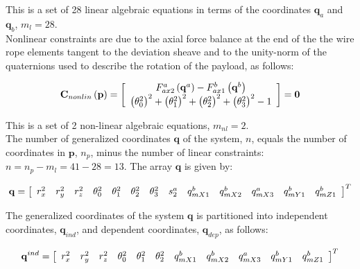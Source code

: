 \setlength{\parindent}{0cm}
This is a set of 28 linear algebraic equations in terms of the coordinates $\textbf{q}_a$ and $\textbf{q}_b$, $m_l = 28$.\\     

Nonlinear constraints are due to the axial force balance at the end of the the wire rope elements tangent to the deviation sheave and to the unity-norm of the quaternions used to describe the rotation of the payload, as follows: 

\begin{equation} 
{{\bf{C}}_{nonlin}}\left( {\bf{p}} \right) = \left[ {\begin{array}{*{20}{c}}
{F_{ax2}^a\left( {{{\bf{q}}^a}} \right) - F_{ax1}^b\left( {{{\bf{q}}^b}} \right)}\\
{{{\left( {\theta _0^2} \right)}^2} + {{\left( {\theta _1^2} \right)}^2} + {{\left( {\theta _2^2} \right)}^2} + {{\left( {\theta _3^2} \right)}^2} - 1}
\end{array}} \right] = {\bf{0}}
\label{WRnl}
\end{equation}

\setlength{\parindent}{0cm}
This is a set of 2 non-linear algebraic equations, $m_{nl} = 2$.\\

The number of generalized coordinates $\textbf{q}$ of the system, $n$, equals the number of coordinates in $\textbf{p}$, $n_p$, minus the number of linear constraints: $n = {n_p} - {m_l} = 41 - 28 = 13$.
The array $\textbf{q}$ is given by:

\begin{equation} \label{setq_Elev}
{\bf{q}} = {\left[ {\begin{array}{*{20}{c}}
{r_x^2}&{r_y^2}&{r_z^2}&{\theta _0^2}&{\theta _1^2}&{\theta _2^2}&{\theta _3^2}&{s_2^a}&{q_{mX1}^b}&{q_{mX2}^b}&{q_{mX3}^a}&{q_{mY1}^b}&{q_{mZ1}^b}
\end{array}} \right]^T}
\end{equation}

The generalized coordinates of the system $\textbf{q}$ is partitioned into independent coordinates, $\textbf{q}_{ind}$, and dependent coordinates, $\textbf{q}_{dep}$, as follows: 

\begin{equation} \label{subsetsq_Elev}
{{\bf{q}}^{ind}} = {\left[ {\begin{array}{*{20}{c}}
{r_x^2}&{r_y^2}&{r_z^2}&{\theta _0^2}&{\theta _1^2}&{\theta _2^2}&{q_{mX1}^b}&{q_{mX2}^b}&{q_{mX3}^a}&{q_{mY1}^b}&{q_{mZ1}^b}
\end{array}} \right]^T}
\end{equation}

